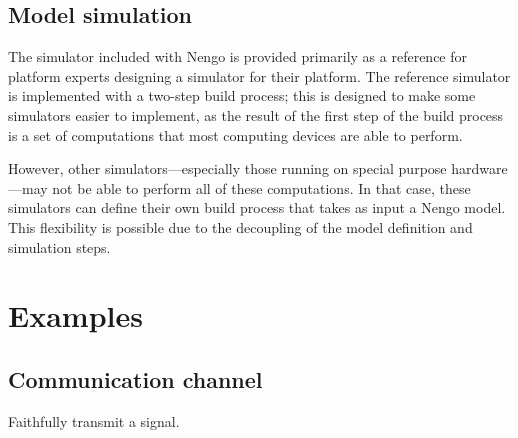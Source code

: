 \documentclass{frontiersSCNS}
\begin{document}
\subsection{Model simulation}

The simulator included with Nengo
is provided primarily as a reference
for platform experts designing a simulator
for their platform.
The reference simulator is implemented with
a two-step build process;
this is designed to make
some simulators easier to implement,
as the result of
the first step of the build process
is a set of computations
that most computing devices are able to perform.

However, other simulators---especially
those running on special purpose
hardware---may not be able
to perform all of these computations.
In that case, these simulators
can define their own build process
that takes as input a Nengo model.
This flexibility is possible
due to the decoupling of
the model definition and simulation steps.

\section{Examples}

\subsection{Communication channel}

Faithfully transmit a signal.
\end{document}
